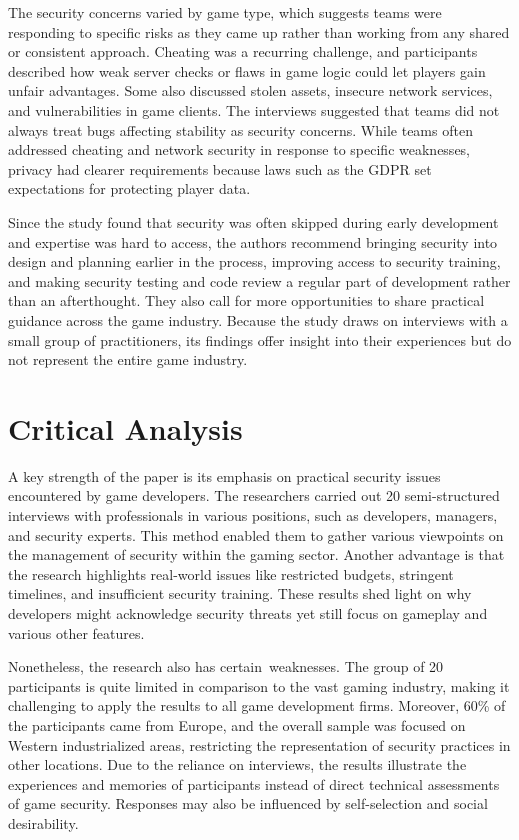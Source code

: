 \documentclass[conference]{IEEEtran}
\begin{document}
The security concerns varied by game type, which suggests teams were responding to specific risks as they came up rather than working from any shared or consistent approach. Cheating was a recurring challenge, and participants described how weak server checks or flaws in game logic could let players gain unfair advantages. Some also discussed stolen assets, insecure network services, and vulnerabilities in game clients. The interviews suggested that teams did not always treat bugs affecting stability as security concerns. While teams often addressed cheating and network security in response to specific weaknesses, privacy had clearer requirements because laws such as the GDPR set expectations for protecting player data.

Since the study found that security was often skipped during early development and expertise was hard to access, the authors recommend bringing security into design and planning earlier in the process, improving access to security training, and making security testing and code review a regular part of development rather than an afterthought. They also call for more opportunities to share practical guidance across the game industry. Because the study draws on interviews with a small group of practitioners, its findings offer insight into their experiences but do not represent the entire game industry.

\section{Critical Analysis}
A key strength of the paper is its emphasis on practical security issues encountered by game developers. The researchers carried out 20 semi-structured interviews with professionals in various positions, such as developers, managers, and security experts. This method enabled them to gather various viewpoints on the management of security within the gaming sector. Another advantage is that the research highlights real-world issues like restricted budgets, stringent timelines, and insufficient security training. These results shed light on why developers might acknowledge security threats yet still focus on gameplay and various other features.

Nonetheless, the research also has certain weaknesses. The group of 20 participants is quite limited in comparison to the vast gaming industry, making it challenging to apply the results to all game development firms. Moreover, 60\% of the participants came from Europe, and the overall sample was focused on Western industrialized areas, restricting the representation of security practices in other locations. Due to the reliance on interviews, the results illustrate the experiences and memories of participants instead of direct technical assessments of game security. Responses may also be influenced by self-selection and social desirability.
\end{document}
